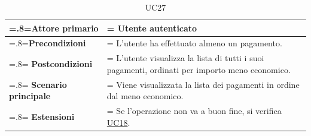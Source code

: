             \begin{table}[H]
                \centering
                \renewcommand{\arraystretch}{1.8}
                \renewcommand\tabularxcolumn[1]{m{#1}}
                \begin{tabularx}{0.9\textwidth} {
                    >{\hsize=.8\hsize\linewidth=\hsize}X
                    >{\hsize=1.2\hsize\linewidth=\hsize}X}
                    \hline
                    \textbf{Attore primario} & Utente autenticato \\
                    \hline
                    \textbf{Precondizioni} & L'utente ha effettuato almeno un pagamento. \\
                    \hline
                    \textbf{Postcondizioni} & L'utente visualizza la lista di tutti i suoi pagamenti, ordinati per importo meno economico. \\
                    \hline
                    \textbf{Scenario principale} & Viene visualizzata la lista dei pagamenti in ordine dal meno economico. \\
                    \hline
                    \textbf{Estensioni} & Se l'operazione non va a buon fine, si verifica \hyperref[UC18]{UC18}. \\
                    \hline
                \end{tabularx}
                \caption{UC27}
            \end{table}

\pagebreak